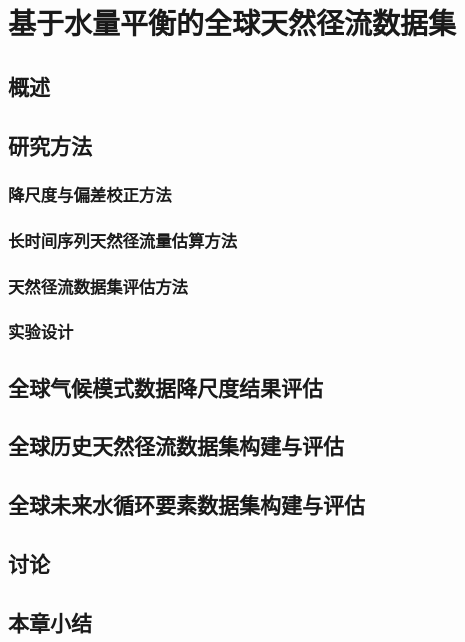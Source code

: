 \chapter{基于水量平衡的全球天然径流数据集}
\label{chap:model_compare}

\section{概述}

\section{研究方法}

\subsection{降尺度与偏差校正方法}

\subsection{长时间序列天然径流量估算方法}

\subsection{天然径流数据集评估方法}

\subsection{实验设计}

\section{全球气候模式数据降尺度结果评估}

\section{全球历史天然径流数据集构建与评估}

\section{全球未来水循环要素数据集构建与评估}

\section{讨论}

\section{本章小结}

\clearpage